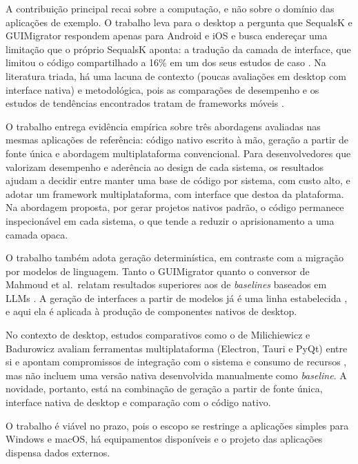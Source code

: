 
A contribuição principal recai sobre a computação, e não sobre o domínio das aplicações de exemplo. O trabalho leva para o desktop a pergunta que SequalsK e GUIMigrator respondem apenas para Android e iOS e busca endereçar uma limitação que o próprio SequalsK aponta: a tradução da camada de interface, que limitou o código compartilhado a 16\% em um dos seus estudos de caso \cite{schultes2025native}. Na literatura triada, há uma lacuna de contexto (poucas avaliações em desktop com interface nativa) e metodológica, pois as comparações de desempenho e os estudos de tendências encontrados tratam de frameworks móveis \cite{biorn2020empirical, jost2025state}.

O trabalho entrega evidência empírica sobre três abordagens avaliadas nas mesmas aplicações de referência: código nativo escrito à mão, geração a partir de fonte única e abordagem multiplataforma convencional. Para desenvolvedores que valorizam desempenho e aderência ao design de cada sistema, os resultados ajudam a decidir entre manter uma base de código por sistema, com custo alto, e adotar um framework multiplataforma, com interface que destoa da plataforma. Na abordagem proposta, por gerar projetos nativos padrão, o código permanece inspecionável em cada sistema, o que tende a reduzir o aprisionamento a uma camada opaca.

O trabalho também adota geração determinística, em contraste com a migração por modelos de linguagem. Tanto o GUIMigrator quanto o conversor de Mahmoud et al.\ relatam resultados superiores aos de \textit{baselines} baseados em LLMs \cite{gao2026guimigrator, mahmoud2024trans}. A geração de interfaces a partir de modelos já é uma linha estabelecida \cite{ruiz2019evaluating}, e aqui ela é aplicada à produção de componentes nativos de desktop.

No contexto de desktop, estudos comparativos como o de Milichiewicz e Badurowicz avaliam ferramentas multiplataforma (Electron, Tauri e PyQt) entre si e apontam compromissos de integração com o sistema e consumo de recursos \cite{milichiewicz2025comparative}, mas não incluem uma versão nativa desenvolvida manualmente como \textit{baseline}. A novidade, portanto, está na combinação de geração a partir de fonte única, interface nativa de desktop e comparação com o código nativo.

O trabalho é viável no prazo, pois o escopo se restringe a aplicações simples para Windows e macOS, há equipamentos disponíveis e o projeto das aplicações dispensa dados externos.